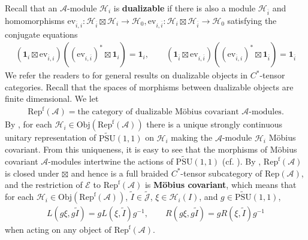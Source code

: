 \documentclass[12pt,a4paper,notitlepage]{article}
\theoremstyle{definition}
\theoremstyle{plain}
\newcommand{\mc}{\mathcal}
\newcommand{\wtd}{\widetilde}
\newcommand{\ovl}{\overline}
\newcommand{\id}{\mathbf{1}}
\newcommand{\ev}{\mathrm{ev}}
\newcommand{\opp}{\mathrm{opp}}
\newcommand{\scr}{\mathscr}
\newcommand{\Jtd}{\widetilde{\mathcal J}}
\newcommand{\RepA}{\mathrm{Rep}(\mathcal A)}
\newcommand{\RepfA}{\mathrm{Rep}^{\mathrm f}(\mathcal A)}
\newcommand{\UPSU}{\widetilde{\mathrm{PSU}}(1,1)}
\newcommand{\Obj}{\mathrm{Obj}}
\numberwithin{equation}{section}
\begin{document}
	
Recall that an $\mc A$-module $\mc H_i$ is \textbf{dualizable} if there is also a module $\mc H_{\ovl i}$ and homomorphisms $\ev_{\ovl i,i}:\mc H_{\ovl i}\boxtimes\mc H_i\rightarrow\mc H_0,\ev_{i,\ovl i}:\mc H_i\boxtimes\mc H_{\ovl i}\rightarrow\mc H_0$ satisfying the conjugate equations
\begin{align}\label{eq22}
(\id_i\boxtimes\ev_{\ovl i,i})((\ev_{i,\ovl i})^*\boxtimes\id_i)=\id_i,\qquad(\id_{\ovl i}\boxtimes\ev_{i,\ovl i})((\ev_{\ovl i,i})^*\boxtimes\id_{\ovl i})=\id_{\ovl i}	
\end{align}
We refer the readers to \cite{LR97,Yam04,BDH14} for general results on dualizable objects in $C^*$-tensor categories. Recall  that the spaces of morphisms between dualizable objects are finite dimensional. We let
\begin{align*}
\RepfA=\text{the category of dualizable M\"obius covariant $\mc A$-modules}.	
\end{align*}
By \cite[Prop. 2.2]{GL96}, for each $\mc H_i\in\Obj(\RepfA)$ there is a unique strongly continuous unitary representation of $\UPSU$ on $\mc H_i$ making the $\mc A$-module $\mc H_i$ M\"obius covariant. From this uniqueness, it is easy to see that the morphisms of M\"obius covariant $\mc A$-modules intertwine the actions of $\UPSU$ (cf. \cite[Lemma B.1]{Gui21b}). By \cite[Sec. B]{Gui21b}, $\RepfA$ is closed under $\boxtimes$ and hence is a full braided $C^*$-tensor subcategory of $\RepA$, and the restriction of $\scr E$ to $\RepfA$ is \textbf{M\"obius covariant}, which means that  for each $\mc H_i\in\Obj(\RepfA)$, $\wtd I\in\Jtd$, $\xi\in\mc H_i(I)$, and $g\in\UPSU$,
\begin{align}
	L(g\xi,g\wtd I)=gL(\xi,\wtd I)g^{-1},\qquad R(g\xi,g\wtd I)=gR(\xi,\wtd I)g^{-1}\label{eq31}	
\end{align}
when acting on any object of $\RepfA$.



	
\end{document}
